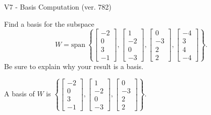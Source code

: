 \begin{exercise}
  \begin{exerciseTitle}V7 - Basis Computation (ver. 782)\end{exerciseTitle}
  \begin{exerciseStatement}
    Find a basis for the subspace 
\[W=\mathrm{span}\ \left\{\left[\begin{array}{r}
-2 \\
0 \\
3 \\
-1
\end{array}\right] , \left[\begin{array}{r}
1 \\
-2 \\
0 \\
-3
\end{array}\right] , \left[\begin{array}{r}
0 \\
-3 \\
2 \\
2
\end{array}\right] , \left[\begin{array}{r}
-4 \\
3 \\
4 \\
-4
\end{array}\right]\right\}.\]
 Be sure to explain why your result is a basis.


  \end{exerciseStatement}
  \begin{exerciseAnswer}
   A basis of \(W\) is  \(\left\{\left[\begin{array}{r}
-2 \\
0 \\
3 \\
-1
\end{array}\right] , \left[\begin{array}{r}
1 \\
-2 \\
0 \\
-3
\end{array}\right] , \left[\begin{array}{r}
0 \\
-3 \\
2 \\
2
\end{array}\right]\right\}\).
  


  \end{exerciseAnswer}
\end{exercise}